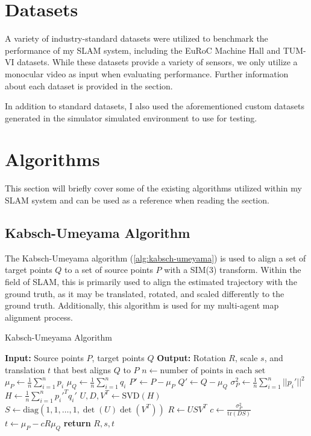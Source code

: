\section{Datasets}
\label{sec:datasets}
A variety of industry-standard datasets were utilized to benchmark the performance of my SLAM system, including the EuRoC Machine Hall \autocite{burri2016euroc} and TUM-VI \autocite{8593419} datasets. While these datasets provide a variety of sensors, we only utilize a monocular video as input when evaluating performance. Further information about each dataset is provided in the  section.

In addition to standard datasets, I also used the aforementioned custom datasets generated in the simulator simulated environment to use for testing.

\section{Algorithms}
\label{sec:algorithms}
This section will briefly cover some of the existing algorithms utilized within my SLAM system and can be used as a reference when reading the  section.

\subsection{Kabsch-Umeyama Algorithm}
\label{sec:kabsch-umeyama-algorithm}
The Kabsch-Umeyama algorithm (\autoref{alg:kabsch-umeyama}) is used to align a set of target points $Q$ to a set of source points $P$ with a SIM(3) transform. Within the field of SLAM, this is primarily used to align the estimated trajectory with the ground truth, as it may be translated, rotated, and scaled differently to the ground truth. Additionally, this algorithm is used for my multi-agent map alignment process.

\begin{algorithm}[H]
    \caption{Kabsch-Umeyama Algorithm}
    \label{alg:kabsch-umeyama}
    \begin{algorithmic}[1]
        \State \textbf{Input:} Source points $P$, target points $Q$
        \State \textbf{Output:} Rotation $R$, scale $s$, and translation $t$ that best aligns $Q$ to $P$
        \State $n \gets \text{number of points in each set}$
        \State $\mu_P \gets \frac{1}{n} \sum_{i=1}^n p_i$
        \State $\mu_Q \gets \frac{1}{n} \sum_{i=1}^n q_i$
        \State $P' \gets P - \mu_P$ 
        \State $Q' \gets Q - \mu_Q$ 
        \State $\sigma^2_P \gets \frac{1}{n} \sum_{i=1}^n ||p_i'||^2$ 
        \State $H \gets \frac{1}{n} \sum_{i=1}^n p_i'^T q_i'$ 
        \State $U, D, V^T \gets \text{SVD}(H)$ 
        \State $S \gets \text{diag}(1, 1, \dots, 1, \det(U)\det(V^T))$
        \State $R \gets USV^T$ 
        \State $c \gets \frac{\sigma^2_P}{\text{tr}(DS)}$ 
        \State $t \gets \mu_P - cR\mu_Q$ 
        \State \textbf{return} $R, s, t$
    \end{algorithmic}
\end{algorithm}

